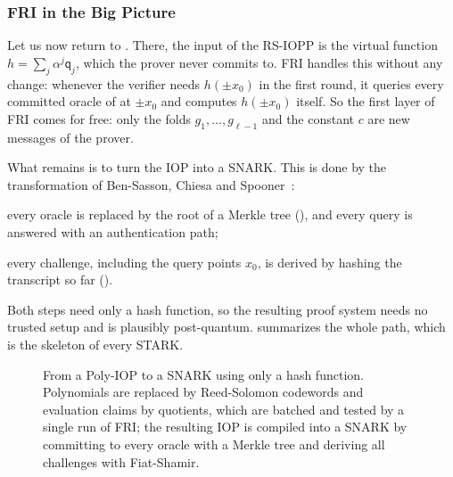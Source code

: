 \documentclass[../../book]{subfiles}
\begin{document}
\subsubsection{FRI in the Big Picture}\label{subsubsec:fri-big-picture}

Let us now return to .
There, the input of the RS-IOPP is the virtual function $h = \sum_j \alpha^j \mathsf{q}_j$, which the prover never commits to.
FRI handles this without any change: whenever the verifier needs $h(\pm x_0)$ in the first round, it queries every committed oracle of  at $\pm x_0$ and computes $h(\pm x_0)$ itself.
So the first layer of FRI comes for free: only the folds $g_1, \dots, g_{\ell-1}$ and the constant $c$ are new messages of the prover.

What remains is to turn the IOP into a SNARK.
This is done by the transformation of Ben-Sasson, Chiesa and Spooner~\cite{TCC:BenChiSpo16}:
\begin{algoen}
    \item every oracle is replaced by the root of a Merkle tree (), and every query is answered with an authentication path;
    \item every challenge, including the query points $x_0$, is derived by hashing the transcript so far ().
\end{algoen}
Both steps need only a hash function, so the resulting proof system needs no trusted setup and is plausibly post-quantum.
 summarizes the whole path, which is the skeleton of every STARK.

\begin{figure}[ht]
    \centering
    \caption{From a Poly-IOP to a SNARK using only a hash function. Polynomials are replaced by Reed-Solomon codewords and evaluation claims by quotients, which are batched and tested by a single run of FRI; the resulting IOP is compiled into a SNARK by committing to every oracle with a Merkle tree and deriving all challenges with Fiat-Shamir.}
    \label{fig:fri-pipeline}
\end{figure}
\end{document}
